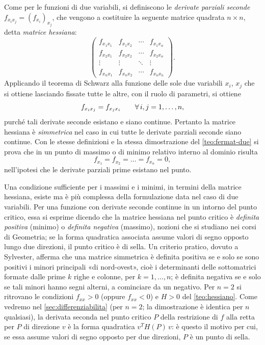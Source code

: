 Come per le funzioni di due variabili, si definiscono le \emph{derivate parziali
seconde} $f_{x_{i}x_{j}}=(f_{x_{i}})_{x_{j}}$, che vengono a costituire la seguente
matrice quadrata $n\times n$, detta \emph{matrice hessiana}:
\begin{equation}\label{eq:matrice-hessiana}
  \begin{pmatrix}
    f_{x_{1}x_{1}} & f_{x_{1}x_{2}} & \cdots & f_{x_{1}x_{n}}\\
    f_{x_{2}x_{1}} & f_{x_{2}x_{2}} & \cdots & f_{x_{2}x_{n}}\\
    \vdots & \vdots & \ddots & \vdots\\
    f_{x_{n}x_{1}} & f_{x_{n}x_{2}} & \cdots & f_{x_{n}x_{n}}
  \end{pmatrix}.
\end{equation}
Applicando il teorema di Schwarz alla funzione delle sole due variabili $x_{i}$, $x_{j}$
che si ottiene lasciando fissate tutte le altre, con il ruolo di parametri, si ottiene
\begin{equation}\label{eq:schwarz-n}
  f_{x_{i}x_{j}}=f_{x_{j}x_{i}} \qquad\forall\, i,j=1,\dots,n,
\end{equation}
purché tali derivate seconde esistano e siano continue. Pertanto la matrice hessiana è
\emph{simmetrica} nel caso in cui tutte le derivate parziali seconde siano continue. Con
le stesse definizioni e la stessa dimostrazione del \cref{teo:fermat-due} si prova che in
un punto di massimo o di minimo relativo interno al dominio risulta
\begin{equation}\label{eq:fermat-n}
  f_{x_{1}}=f_{x_{2}}=\dots=f_{x_{n}}=0,
\end{equation}
nell'ipotesi che le derivate parziali prime esistano nel punto.

\begin{osservazione}\label{oss:hessiana-n}
Una condizione sufficiente per i massimi e i minimi, in termini della matrice hessiana,
esiste ma è più complessa della formulazione data nel caso di due variabili. Per una
funzione con derivate seconde continue in un intorno del punto critico, essa si
esprime dicendo che la matrice hessiana nel punto critico è \emph{definita positiva}
(minimo) o \emph{definita negativa} (massimo), nozioni che si studiano nei corsi di
Geometria; se la forma quadratica associata assume valori di segno opposto lungo due
direzioni, il punto critico è di sella. Un criterio pratico, dovuto a Sylvester, afferma
che una matrice simmetrica è definita positiva se e solo se sono positivi i minori
principali «di nord-ovest», cioè i determinanti delle sottomatrici formate dalle prime
$k$ righe e colonne, per $k=1,\dots,n$; è definita negativa se e solo se tali minori
hanno segni alterni, a cominciare da un negativo. Per $n=2$ si ritrovano le condizioni
$f_{xx}>0$ (oppure $f_{xx}<0$) e $H>0$ del \cref{teo:hessiano}. Come vedremo nel
\cref{sec:differenziabilita} (per $n=2$; la dimostrazione è identica per $n$ qualsiasi),
la derivata seconda nel punto critico $P$ della restrizione di $f$ alla retta per $P$ di
direzione $v$ è la forma quadratica $v^{T}H(P)\,v$: è questo il motivo per cui, se essa
assume valori di segno opposto per due direzioni, $P$ è un punto di sella.
\end{osservazione}

